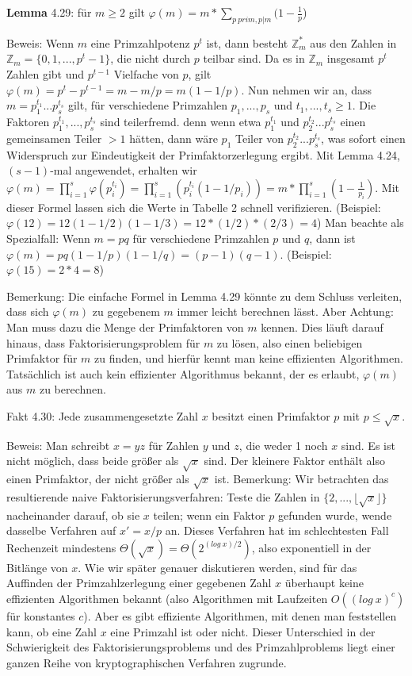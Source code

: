 \documentclass[a4paper]{article}
\begin{document}
\begin{multicols}{3}
    \textbf{Lemma} 4.29: für $m\geq 2$ gilt $\varphi(m)=m*\sum_{p\ prim, p|m} (1-\frac{1}{p}$)

        Beweis: Wenn $m$ eine Primzahlpotenz $p^t$ ist, dann besteht $\mathbb{Z}^*_m$ aus den Zahlen in $\mathbb{Z}_m=\{0,1,...,p^t-1\}$, die nicht durch $p$ teilbar sind. Da es in $\mathbb{Z}_m$ insgesamt $p^t$ Zahlen gibt und $p^{t-1}$ Vielfache von $p$, gilt $\varphi(m)=p^t-p^{t-1} =m-m/p=m(1-1/p)$. Nun nehmen wir an, dass $m=p^{t_1}_1 ...p^{t_s}_s$ gilt, für verschiedene Primzahlen $p_1,...,p_s$ und $t_1,...,t_s\geq 1$. Die Faktoren $p^{t_1}_1,...,p^{t_s}_s$ sind teilerfremd. denn wenn etwa $p^{t_1}_1$ und $p^{t_2}_2...p^{t_s}_s$ einen gemeinsamen Teiler $>1$ hätten, dann wäre $p_1$ Teiler von $p^{t_2}_2...p^{t_s}_s$, was sofort einen Widerspruch zur Eindeutigkeit der Primfaktorzerlegung ergibt. Mit Lemma 4.24, $(s-1)$-mal angewendet, erhalten wir $\varphi(m) =\prod^s_{i=1} \varphi(p^{t_i}_i) = \prod^s_{i=1} (p^{t_i}_i (1-1/p_i)) =m* \prod^s_{i=1} (1-\frac{1}{p_i})$.
        Mit dieser Formel lassen sich die Werte in Tabelle 2 schnell verifizieren. (Beispiel: $\varphi(12) = 12(1-1/2)(1-1/3) = 12*(1/2)*(2/3) = 4$) Man beachte als Spezialfall: Wenn $m=pq$ für verschiedene Primzahlen $p$ und $q$, dann ist $\varphi(m)=pq(1-1/p)(1-1/q) =(p-1)(q-1)$. (Beispiel: $\varphi(15) =2*4=8$)

        Bemerkung: Die einfache Formel in Lemma 4.29 könnte zu dem Schluss verleiten, dass sich $\varphi(m)$ zu gegebenem $m$ immer leicht berechnen lässt. Aber Achtung: Man muss dazu die Menge der Primfaktoren von $m$ kennen. Dies läuft darauf hinaus, dass Faktorisierungsproblem für $m$ zu lösen, also einen beliebigen Primfaktor für $m$ zu finden, und hierfür kennt man keine effizienten Algorithmen. Tatsächlich ist auch
        kein effizienter Algorithmus bekannt, der es erlaubt, $\varphi(m)$ aus $m$ zu berechnen.

        Fakt 4.30: Jede zusammengesetzte Zahl $x$ besitzt einen Primfaktor $p$ mit $p\leq\sqrt{x}$.

        Beweis: Man schreibt $x=yz$ für Zahlen $y$ und $z$, die weder 1 noch $x$ sind. Es ist nicht möglich, dass beide größer als $\sqrt{x}$ sind. Der kleinere Faktor enthält also einen Primfaktor, der nicht größer als $\sqrt{x}$ ist.
        Bemerkung: Wir betrachten das resultierende naive Faktorisierungsverfahren: Teste die Zahlen in $\{2,...,\lfloor\sqrt{x}\rfloor\}$ nacheinander darauf, ob sie $x$ teilen; wenn ein Faktor $p$ gefunden wurde, wende dasselbe Verfahren auf $x'=x/p$ an. Dieses Verfahren hat im schlechtesten Fall Rechenzeit mindestens $\Theta (\sqrt{x}) = \Theta (2^{(log\ x)/ 2})$, also exponentiell in der Bitlänge von $x$. Wie wir später genauer diskutieren werden, sind für das Auffinden der Primzahlzerlegung einer gegebenen Zahl $x$ überhaupt keine effizienten Algorithmen bekannt (also Algorithmen mit Laufzeiten $O((log\ x)^c)$ für konstantes $c$). Aber es gibt effiziente Algorithmen, mit denen man feststellen kann, ob eine Zahl $x$ eine Primzahl ist oder nicht. Dieser Unterschied in der Schwierigkeit des Faktorisierungsproblems und des Primzahlproblems liegt einer ganzen Reihe von kryptographischen Verfahren zugrunde.


\end{multicols}
\end{document}

